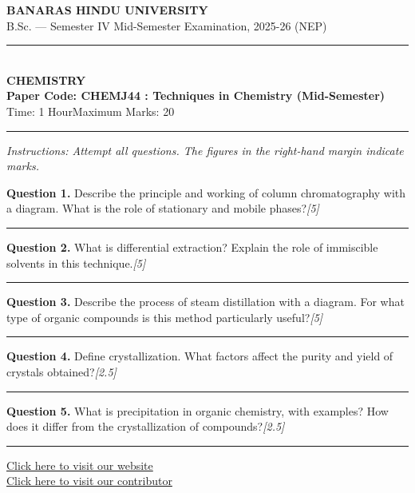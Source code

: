 \documentclass[11pt,a4paper]{article}
\newcommand{\pts}[1]{\hfill   \textit{[#1]}}
\begin{document}
\begin{center}
  {\large\bfseries BANARAS HINDU UNIVERSITY}\\[2pt]
  {\normalsize B.Sc. --- Semester IV Mid-Semester Examination, 2025-26 (NEP)}\\[6pt]
  \rule{0.8\linewidth}{0.5pt}\\[6pt]
  {\large\bfseries CHEMISTRY}\\[4pt]
  {\large\bfseries Paper Code: CHEMJ44 : Techniques in Chemistry (Mid-Semester)}\\[4pt]
  {\normalsize Time: 1 Hour\hfill Maximum Marks: 20}
\end{center}

\rule{\linewidth}{0.4pt}

\smallskip



\noindent   \textit{Instructions: Attempt all questions. The figures in the right-hand margin indicate marks.}

\bigskip




\noindent   \textbf{Question 1.} Describe the principle and working of column chromatography with a diagram. What is the role of stationary and mobile phases?\pts{5}

\medskip\rule{\linewidth}{0.2pt}\medskip




\noindent   \textbf{Question 2.} What is differential extraction? Explain the role of immiscible solvents in this technique.\pts{5}

\medskip\rule{\linewidth}{0.2pt}\medskip




\noindent   \textbf{Question 3.} Describe the process of steam distillation with a diagram. For what type of organic compounds is this method particularly useful?\pts{5}

\medskip\rule{\linewidth}{0.2pt}\medskip




\noindent   \textbf{Question 4.} Define crystallization. What factors affect the purity and yield of crystals obtained?\pts{2.5}

\medskip\rule{\linewidth}{0.2pt}\medskip




\noindent   \textbf{Question 5.} What is precipitation in organic chemistry, with examples? How does it differ from the crystallization of compounds?\pts{2.5}

\vfill
\rule{\linewidth}{0.4pt}

\begin{center}\small
\href{https://bhu-exam.vercel.app/}{Click here to visit our website}\\[4pt]
\href{https://me-aryan.vercel.app/}{Click here to visit our contributor}
\end{center}
\end{document}
